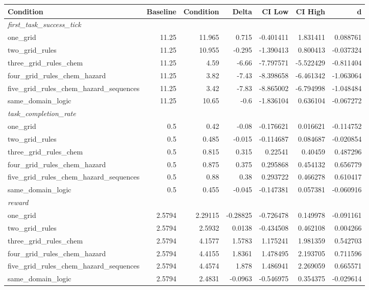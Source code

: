 \begin{tabular}{lrrrrrr}
\toprule
Condition & Baseline & Condition & Delta & CI Low & CI High & d \\
\midrule
  \multicolumn{7}{l}{\textit{first_task_success_tick}} \\
  one_grid & 11.25 & 11.965 & 0.715 & -0.401411 & 1.831411 & 0.088761 \\
  two_grid_rules & 11.25 & 10.955 & -0.295 & -1.390413 & 0.800413 & -0.037324 \\
  three_grid_rules_chem & 11.25 & 4.59 & -6.66 & -7.797571 & -5.522429 & -0.811404 \\
  four_grid_rules_chem_hazard & 11.25 & 3.82 & -7.43 & -8.398658 & -6.461342 & -1.063064 \\
  five_grid_rules_chem_hazard_sequences & 11.25 & 3.42 & -7.83 & -8.865002 & -6.794998 & -1.048484 \\
  same_domain_logic & 11.25 & 10.65 & -0.6 & -1.836104 & 0.636104 & -0.067272 \\
  \multicolumn{7}{l}{\textit{task_completion_rate}} \\
  one_grid & 0.5 & 0.42 & -0.08 & -0.176621 & 0.016621 & -0.114752 \\
  two_grid_rules & 0.5 & 0.485 & -0.015 & -0.114687 & 0.084687 & -0.020854 \\
  three_grid_rules_chem & 0.5 & 0.815 & 0.315 & 0.22541 & 0.40459 & 0.487296 \\
  four_grid_rules_chem_hazard & 0.5 & 0.875 & 0.375 & 0.295868 & 0.454132 & 0.656779 \\
  five_grid_rules_chem_hazard_sequences & 0.5 & 0.88 & 0.38 & 0.293722 & 0.466278 & 0.610417 \\
  same_domain_logic & 0.5 & 0.455 & -0.045 & -0.147381 & 0.057381 & -0.060916 \\
  \multicolumn{7}{l}{\textit{reward}} \\
  one_grid & 2.5794 & 2.29115 & -0.28825 & -0.726478 & 0.149978 & -0.091161 \\
  two_grid_rules & 2.5794 & 2.5932 & 0.0138 & -0.434508 & 0.462108 & 0.004266 \\
  three_grid_rules_chem & 2.5794 & 4.1577 & 1.5783 & 1.175241 & 1.981359 & 0.542703 \\
  four_grid_rules_chem_hazard & 2.5794 & 4.4155 & 1.8361 & 1.478495 & 2.193705 & 0.711596 \\
  five_grid_rules_chem_hazard_sequences & 2.5794 & 4.4574 & 1.878 & 1.486941 & 2.269059 & 0.665571 \\
  same_domain_logic & 2.5794 & 2.4831 & -0.0963 & -0.546975 & 0.354375 & -0.029614 \\

\end{tabular}
